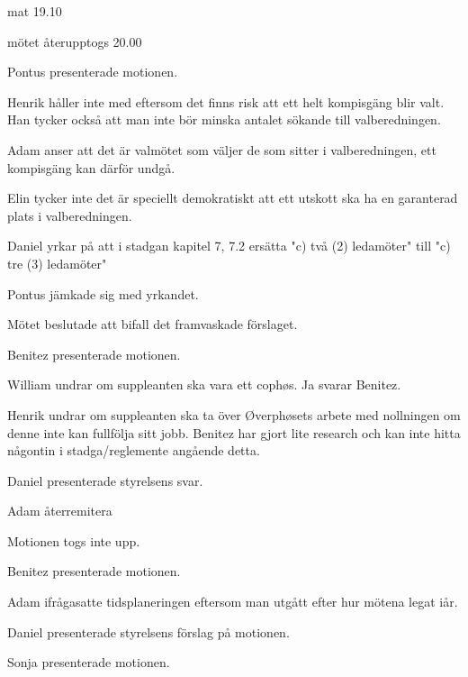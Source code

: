 \documentclass[10pt]{article}
\begin{document}
\begin{paragrafer}
\begin{paragrafer}
		mat 19.10

		mötet återupptogs 20.00

		
		
			Pontus presenterade motionen.

			Henrik håller inte med eftersom det finns risk att ett helt kompisgäng blir valt. Han tycker också att man inte bör minska antalet sökande till valberedningen. 

			Adam anser att det är valmötet som väljer de som sitter i valberedningen, ett kompisgäng kan därför undgå.

			Elin tycker inte det är speciellt demokratiskt att ett utskott ska ha en garanterad plats i valberedningen. 

			Daniel yrkar på att i stadgan kapitel 7, 7.2 ersätta "c) två (2) ledamöter" till "c) tre (3) ledamöter"
		
			Pontus jämkade sig med yrkandet.

			Mötet beslutade att bifall det framvaskade förslaget. 


		Benitez presenterade motionen.

		William undrar om suppleanten ska vara ett cophøs. Ja svarar Benitez.
		
		Henrik undrar om suppleanten ska ta över Øverphøsets arbete med nollningen om denne inte kan fullfölja sitt jobb. Benitez har gjort lite research och kan inte hitta någontin i stadga/reglemente angående detta.

		Daniel presenterade styrelsens svar. 

		Adam \ypa återremitera


		Motionen togs inte upp.

		
		
		Benitez presenterade motionen. 

		Adam ifrågasatte tidsplaneringen eftersom man utgått efter hur mötena legat iår. 

		Daniel presenterade styrelsens förslag på motionen. 

		Sonja presenterade motionen.


\end{paragrafer}
\end{paragrafer}
\end{document}
